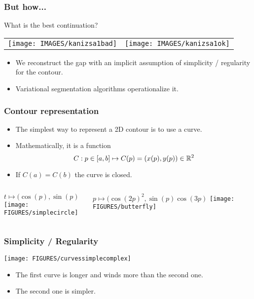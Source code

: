 \documentclass[9pt]{beamer}
\begin{document}
\begin{frame}
  \frametitle{But how...}
  What is the best continuation?
   \begin{center}
     \begin{tabular}[h]{cc}
        \texttt{[image: IMAGES/kanizsa1bad]} &
      \texttt{[image: IMAGES/kanizsa1ok]} \\
     \end{tabular}
   \end{center}
   \begin{itemize}
   \item  We reconstruct the gap with an implicit assumption of simplicity / regularity for the contour.
   \item  Variational segmentation algorithms operationalize it.
   \end{itemize}

\end{frame}



\begin{frame}
  \frametitle{Contour representation}
  \begin{itemize}
  \item The simplest way to represent a 2D contour is to use a curve.
  \item Mathematically, it is a function
    $$
    C: p\in[a,b] \mapsto C(p) = (x(p), y(p))\in {\mathbb R}^2
    $$
  \item If $C(a) = C(b)$ the curve is closed.
  \end{itemize}
  \begin{columns}
    \vspace{-5mm}
    \begin{center}
       $t\mapsto(\cos(p),\sin(p)$\\
    \texttt{[image: FIGURES/simplecircle]}
    \end{center}
    $p\mapsto(\cos(2p)^2,\sin(p)\cos(3p)$
    \texttt{[image: FIGURES/butterfly]}
  \end{columns}
\end{frame}


\begin{frame}
  \frametitle{Simplicity / Regularity}
  \begin{center}
    \texttt{[image: FIGURES/curvessimplecomplex]}
  \end{center}
  \begin{itemize}
  \item The first curve is longer and winds more than the second one.
  \item The second one is simpler.
  \end{itemize}
\end{frame}
\end{document}
